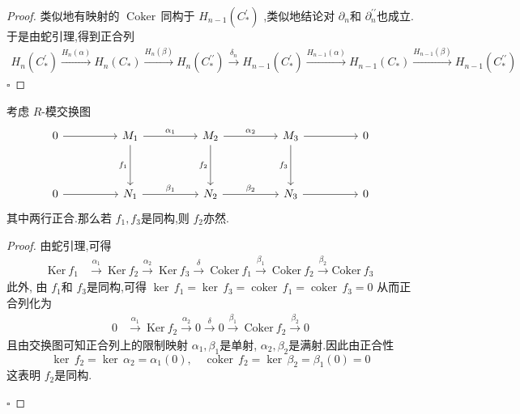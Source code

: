 \documentclass[../../几何与拓扑.tex]{subfiles}
\begin{document}
\begin{proof}
    类似地有映射的 \(  \operatorname{Coker}\,  \)同构于  \(  H_{n-1}\left( C_{*}^{\prime}  \right)   \)  ,类似地结论对 \(  \partial _{n}  \)和 \(  \partial _{n} ^{\prime \prime}   \)也成立.  于是由蛇引理,得到正合列 \[
        \begin{aligned}H_n(C_*^{\prime})\xrightarrow{H_n(\alpha)}H_n(C_*)\xrightarrow{H_n(\beta)}H_n(C_*^{\prime\prime})\xrightarrow{\delta_n}H_{n-1}(C_*^{\prime})\xrightarrow{H_{n-1}(\alpha)}H_{n-1}(C_*)\xrightarrow{H_{n-1}(\beta)}H_{n-1}(C_*^{\prime\prime})\end{aligned}
    \]
    \hfill $\square$
\end{proof}

\begin{corollary}
    考虑 \(  R  \)-模交换图 
    \[\begin{tikzcd}
	0 && {M_1} && {M_2} && {M_3} && 0 \\
	\\
	0 && {N_1} && {N_2} && {N_3} && 0
	\arrow[from=1-1, to=1-3]
	\arrow["{\alpha_1}", from=1-3, to=1-5]
	\arrow["{f_1}"', from=1-3, to=3-3]
	\arrow["{\alpha_2}", from=1-5, to=1-7]
	\arrow["{f_2}"', from=1-5, to=3-5]
	\arrow[from=1-7, to=1-9]
	\arrow["{f_3}"', from=1-7, to=3-7]
	\arrow[from=3-1, to=3-3]
	\arrow["{\beta_1}", from=3-3, to=3-5]
	\arrow["{\beta_2}", from=3-5, to=3-7]
	\arrow[from=3-7, to=3-9]
\end{tikzcd}\]
    其中两行正合.那么若 \(  f_1,f_3  \)是同构,则 \(  f_2  \)亦然.
    

\end{corollary}

\begin{proof}

    由蛇引理,可得  \[
        \begin{aligned}\mathrm{Ker~}f_1&\xrightarrow{\alpha_1}\mathrm{~Ker~}f_2\xrightarrow{\alpha _2 }\mathrm{~Ker~}f_3\xrightarrow{\delta}\mathrm{~Coker~}f_1\xrightarrow{\beta_1}\mathrm{~Coker~}f_2\xrightarrow{\beta _2 }\mathrm{Coker~}f_3\end{aligned}
    \]此外, 由 \(  f_1  \)和 \(  f_3  \)是同构,可得 \(  \operatorname{ker}\,f_1= \operatorname{ker}\,f_3=  \operatorname{coker}\,f_1= \operatorname{coker}\,f_3= 0 \)
    从而正合列化为      \[
        \begin{aligned} 0&\xrightarrow{\alpha_1}\mathrm{~Ker~}f_2\xrightarrow{\alpha _2 }0\xrightarrow{\delta}0\xrightarrow{\beta_1}\mathrm{~Coker~}f_2\xrightarrow{\beta _2 }0\end{aligned}
    \]且由交换图可知正合列上的限制映射 \(  \alpha _1 ,\beta _1   \)是单射, \(  \alpha _2 ,\beta _2   \)是满射.因此由正合性 \[
    \operatorname{ker}\,f_2= \operatorname{ker}\,\alpha _2 = \alpha_1\left( 0 \right) ,\quad \operatorname{coker}\,f_2= \operatorname{ker}\,\beta _2 = \beta _1 \left( 0 \right)= 0 
    \] 这表明 \(  f_2  \)是同构. 

    \hfill $\square$
\end{proof}
\end{document}
